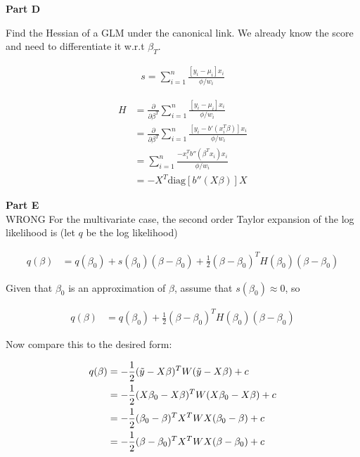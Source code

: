 \documentclass[12pt]{amsart}
\begin{document}
\bigskip

{\bf Part D
} \\
\bigskip
\bigskip


Find the Hessian of a GLM under the canonical link. We already know the score and need to differentiate it w.r.t $\beta_T$.

\begin{align*}
    s = \sum_{i=1}^{n} \frac{[y_i-\mu_i]x_i }{\phi/w_i} 
\end{align*}



\begin{align*}
    H &= \frac{\partial}{\partial \beta^T} \sum_{i=1}^{n} \frac{[y_i-\mu_i]x_i }{\phi/w_i} \\
    &= \frac{\partial}{\partial \beta^T} \sum_{i=1}^{n} \frac{[y_i-b'(x_i^T\beta)]x_i }{\phi/w_i} \\
    &=\sum_{i=1}^{n} \frac{-x_i^Tb''(\beta^T x_i)x_i }{\phi/w_i} \\
    &=-X^T\mbox{diag}[b''(X\beta)]X
\end{align*}


\bigskip

{\bf Part E
} \\
\bigskip
\bigskip
WRONG 
For the multivariate case, the second order Taylor expansion of the log likelihood is (let $q$ be the log likelihood)


\begin{align*}
   q(\beta) &= q(\beta_0) + s(\beta_0) (\beta-\beta_0) +\frac{1}{2}(\beta-\beta_0)^T H(\beta_0)(\beta-\beta_0)
\end{align*}

Given that $\beta_0$ is an approximation of $\beta$, assume that $s(\beta_0)\approx 0$, so

\begin{align*}
   q(\beta) &= q(\beta_0)  +\frac{1}{2}(\beta-\beta_0)^T H(\beta_0)(\beta-\beta_0)
\end{align*}

Now compare this to the desired form:

\begin{align*}
   q(\beta) &= -\frac{1}{2} (\Tilde{y}-X\beta)^T W(\Tilde{y}-X\beta) + c\\
   &= -\frac{1}{2} (X\beta_0-X\beta)^T W(X\beta_0-X\beta) + c\\
   &= -\frac{1}{2} (\beta_0-\beta)^TX^T WX(\beta_0-\beta) + c\\
   &= -\frac{1}{2} (\beta-\beta_0)^TX^T WX(\beta-\beta_0) + c\\
\end{align*}
\end{document}
